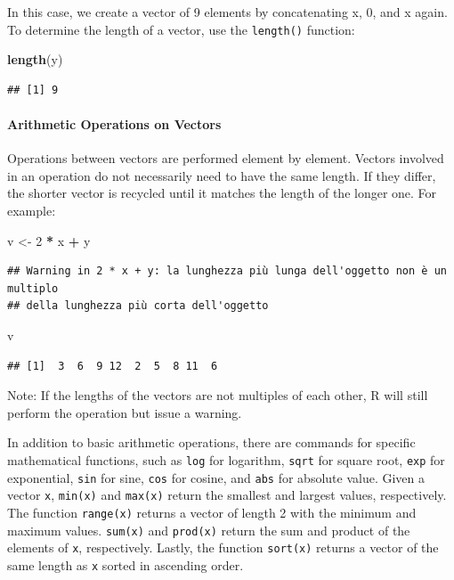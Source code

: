 \documentclass[
]{article}
\newenvironment{Shaded}{\begin{snugshade}}{\end{snugshade}}
\newcommand{\DecValTok}[1]{\textcolor[rgb]{0.00,0.00,0.81}{#1}}
\newcommand{\FunctionTok}[1]{\textcolor[rgb]{0.13,0.29,0.53}{\textbf{#1}}}
\newcommand{\NormalTok}[1]{#1}
\newcommand{\OtherTok}[1]{\textcolor[rgb]{0.56,0.35,0.01}{#1}}
\newcommand{\SpecialCharTok}[1]{\textcolor[rgb]{0.81,0.36,0.00}{\textbf{#1}}}
\begin{document}
In this case, we create a vector of 9 elements by concatenating x, 0,
and x again. To determine the length of a vector, use the
\texttt{length()} function:

\begin{Shaded}
\begin{Highlighting}[]
\FunctionTok{length}\NormalTok{(y)}
\end{Highlighting}
\end{Shaded}

\begin{verbatim}
## [1] 9
\end{verbatim}

\hypertarget{arithmetic-operations-on-vectors}{%
\paragraph{Arithmetic Operations on
Vectors}\label{arithmetic-operations-on-vectors}}

Operations between vectors are performed element by element. Vectors
involved in an operation do not necessarily need to have the same
length. If they differ, the shorter vector is recycled until it matches
the length of the longer one. For example:

\begin{Shaded}
\begin{Highlighting}[]
\NormalTok{v }\OtherTok{\textless{}{-}} \DecValTok{2} \SpecialCharTok{*}\NormalTok{ x }\SpecialCharTok{+}\NormalTok{ y}
\end{Highlighting}
\end{Shaded}

\begin{verbatim}
## Warning in 2 * x + y: la lunghezza più lunga dell'oggetto non è un multiplo
## della lunghezza più corta dell'oggetto
\end{verbatim}

\begin{Shaded}
\begin{Highlighting}[]
\NormalTok{v}
\end{Highlighting}
\end{Shaded}

\begin{verbatim}
## [1]  3  6  9 12  2  5  8 11  6
\end{verbatim}

Note: If the lengths of the vectors are not multiples of each other, R
will still perform the operation but issue a warning.

In addition to basic arithmetic operations, there are commands for
specific mathematical functions, such as \texttt{log} for logarithm,
\texttt{sqrt} for square root, \texttt{exp} for exponential,
\texttt{sin} for sine, \texttt{cos} for cosine, and \texttt{abs} for
absolute value. Given a vector \texttt{x}, \texttt{min(x)} and
\texttt{max(x)} return the smallest and largest values, respectively.
The function \texttt{range(x)} returns a vector of length 2 with the
minimum and maximum values. \texttt{sum(x)} and \texttt{prod(x)} return
the sum and product of the elements of \texttt{x}, respectively. Lastly,
the function \texttt{sort(x)} returns a vector of the same length as
\texttt{x} sorted in ascending order.
\end{document}
